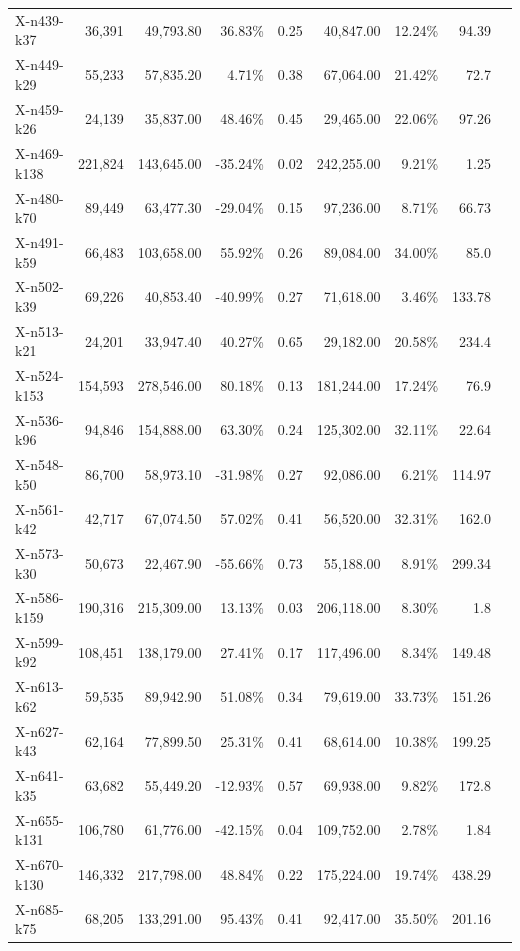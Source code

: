 \documentclass[12pt,a4paper]{article}
\begin{document}
\begin{longtable}{@{}lrrrrrrrr@{}}
    X-n439-k37 & 36,391 & 49,793.80 & 36.83\% & 0.25 & 40,847.00 & 12.24\% & 94.39 \\
    X-n449-k29 & 55,233 & 57,835.20 & 4.71\% & 0.38 & 67,064.00 & 21.42\% & 72.7 \\
    X-n459-k26 & 24,139 & 35,837.00 & 48.46\% & 0.45 & 29,465.00 & 22.06\% & 97.26 \\
    X-n469-k138 & 221,824 & 143,645.00 & -35.24\% & 0.02 & 242,255.00 & 9.21\% & 1.25 \\
    X-n480-k70 & 89,449 & 63,477.30 & -29.04\% & 0.15 & 97,236.00 & 8.71\% & 66.73 \\
    X-n491-k59 & 66,483 & 103,658.00 & 55.92\% & 0.26 & 89,084.00 & 34.00\% & 85.0 \\
    X-n502-k39 & 69,226 & 40,853.40 & -40.99\% & 0.27 & 71,618.00 & 3.46\% & 133.78 \\
    X-n513-k21 & 24,201 & 33,947.40 & 40.27\% & 0.65 & 29,182.00 & 20.58\% & 234.4 \\
    X-n524-k153 & 154,593 & 278,546.00 & 80.18\% & 0.13 & 181,244.00 & 17.24\% & 76.9 \\
    X-n536-k96 & 94,846 & 154,888.00 & 63.30\% & 0.24 & 125,302.00 & 32.11\% & 22.64 \\
    X-n548-k50 & 86,700 & 58,973.10 & -31.98\% & 0.27 & 92,086.00 & 6.21\% & 114.97 \\
    X-n561-k42 & 42,717 & 67,074.50 & 57.02\% & 0.41 & 56,520.00 & 32.31\% & 162.0 \\
    X-n573-k30 & 50,673 & 22,467.90 & -55.66\% & 0.73 & 55,188.00 & 8.91\% & 299.34 \\
    X-n586-k159 & 190,316 & 215,309.00 & 13.13\% & 0.03 & 206,118.00 & 8.30\% & 1.8 \\
    X-n599-k92 & 108,451 & 138,179.00 & 27.41\% & 0.17 & 117,496.00 & 8.34\% & 149.48 \\
    X-n613-k62 & 59,535 & 89,942.90 & 51.08\% & 0.34 & 79,619.00 & 33.73\% & 151.26 \\
    X-n627-k43 & 62,164 & 77,899.50 & 25.31\% & 0.41 & 68,614.00 & 10.38\% & 199.25 \\
    X-n641-k35 & 63,682 & 55,449.20 & -12.93\% & 0.57 & 69,938.00 & 9.82\% & 172.8 \\
    X-n655-k131 & 106,780 & 61,776.00 & -42.15\% & 0.04 & 109,752.00 & 2.78\% & 1.84 \\
    X-n670-k130 & 146,332 & 217,798.00 & 48.84\% & 0.22 & 175,224.00 & 19.74\% & 438.29 \\
    X-n685-k75 & 68,205 & 133,291.00 & 95.43\% & 0.41 & 92,417.00 & 35.50\% & 201.16 \\

\end{longtable}
\end{document}
